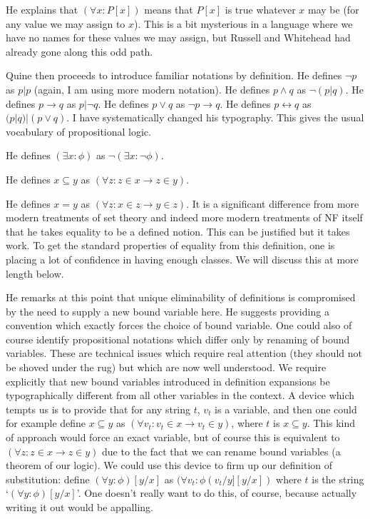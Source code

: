 \documentclass[12pt]{article}
\begin{document}
He explains that $(\forall x:P[x])$ means that $P[x]$ is true whatever $x$ may be (for any value we may assign to $x$).  This is a bit mysterious in a language where we have no names for these values we may assign, but Russell and Whitehead had already gone along this odd path.

Quine then proceeds to introduce familiar notations by definition.  He defines $\neg p$ as $p|p$ (again, I am using more modern notation).  He defines $p \wedge q$ as $\neg(p|q)$.  He defines $p \rightarrow q$ as $p|\neg q$.  He defines $p\vee q$ as $\neg p \rightarrow q$.  He defines $p \leftrightarrow q$ as $(p|q)|(p \vee q)$.  I have systematically changed his typography.  This gives the usual vocabulary of propositional logic.

He defines $(\exists x:\phi)$ as $\neg(\exists x:\neg \phi)$.

He defines $x \subseteq y$ as $(\forall z:z \in x \rightarrow z \in y)$.

He defines $x=y$ as $(\forall z:x \in z \rightarrow y \in z)$.  It is a significant difference from more modern treatments of set theory and indeed more modern treatments of NF itself that he takes equality to be a defined notion.  This can be justified but it takes work.  To get the standard properties of equality from this definition, one is placing a lot of confidence in having enough classes.  We will discuss this at more length below.

He remarks at this point that unique eliminability of definitions is compromised by the need to supply a new bound variable here.  He suggests providing a convention which exactly forces the choice of bound variable.  One could also of course identify propositional notations which differ only by renaming of bound variables.   These are technical issues which require real attention (they should not be shoved under the rug) but which are now well understood.  We require explicitly that new bound variables introduced in definition expansions be typographically different from all other variables in the context.  A device which tempts us is to provide that for any string $t$, $v_t$ is a variable, and then one could for example define $x \subseteq y$ as $(\forall v_t:v_t \in x \rightarrow v_t \in y)$, where $t$ is $x \subseteq y$.  This kind of approach would force an exact variable, but of course this is equivalent to $(\forall z:z \in x \rightarrow z \in y)$ due to the fact that we can rename bound variables (a theorem of our logic).  We could use this device to firm up our definition of substitution:  define $(\forall y:\phi)[y/x]$ as $(\forall v_t:\phi(v_t/y][y/x])$  where $t$ is the string `$(\forall y:\phi)[y/x]$'.  One doesn't really want to do this, of course, because actually writing it out would be appalling.
\end{document}
